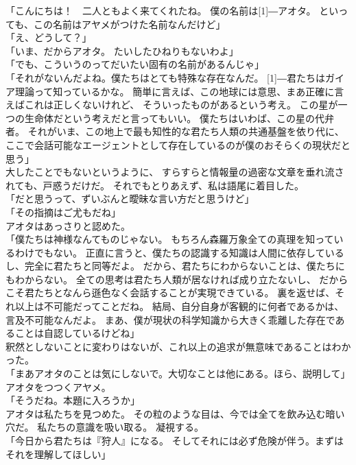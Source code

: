 \documentclass[../IHMain]{subfiles}
\begin{document}
「こんにちは！　二人ともよく来てくれたね。
僕の名前は\scalebox{3}[1]{―}アオタ。
といっても、この名前はアヤメがつけた名前なんだけど」\\
「え、どうして？」\\
「いま、だからアオタ。
たいしたひねりもないわよ」\\
「でも、こういうのってだいたい固有の名前があるんじゃ」\\
「それがないんだよね。僕たちはとても特殊な存在なんだ。
\scalebox{3}[1]{―}君たちはガイア理論って知っているかな。
簡単に言えば、この地球には意思、まあ正確に言えばこれは正しくないけれど、
そういったものがあるという考え。
この星が一つの生命体だという考えだと言ってもいい。
僕たちはいわば、この星の代弁者。
それがいま、この地上で最も知性的な君たち人類の共通基盤を依り代に、
ここで会話可能なエージェントとして存在しているのが僕のおそらくの現状だと思う」\\
大したことでもないというように、
すらすらと情報量の過密な文章を垂れ流されても、戸惑うだけだ。
それでもとりあえず、私は語尾に着目した。\\
「だと思うって、ずいぶんと曖昧な言い方だと思うけど」\\
「その指摘はご尤もだね」\\
アオタはあっさりと認めた。\\
「僕たちは神様なんてものじゃない。
もちろん森羅万象全ての真理を知っているわけでもない。
正直に言うと、僕たちの認識する知識は人間に依存しているし、完全に君たちと同等だよ。
だから、君たちにわからないことは、僕たちにもわからない。
全ての思考は君たち人類が居なければ成り立たないし、
だからこそ君たちとなんら遜色なく会話することが実現できている。
裏を返せば、それ以上は不可能だってことだね。
結局、自分自身が客観的に何者であるかは、言及不可能なんだよ。
まあ、僕が現状の科学知識から大きく乖離した存在であることは自認しているけどね」\\
釈然としないことに変わりはないが、これ以上の追求が無意味であることはわかった。\\
「まあアオタのことは気にしないで。大切なことは他にある。ほら、説明して」\\
アオタをつつくアヤメ。\\
「そうだね。本題に入ろうか」\\
アオタは私たちを見つめた。
その粒のような目は、今では全てを飲み込む暗い穴だ。
私たちの意識を吸い取る。
凝視する。\\
「今日から君たちは『狩人』になる。
そしてそれには必ず危険が伴う。まずはそれを理解してほしい」\\
\end{document}

